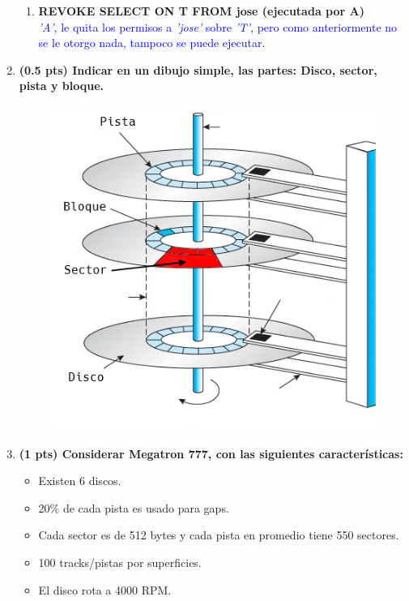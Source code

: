 \documentclass{templateNote}
\begin{document}
\begin{enumerate}
\begin{enumerate}
        \item \textbf{REVOKE SELECT ON T FROM jose (ejecutada por A)}
        \\ \textcolor{blue}{\textit{'A'}, le quita los permisos a \textit{'jose'} sobre \textit{'T'}, pero como anteriormente no se le otorgo nada, tampoco se puede ejecutar.}
    \end{enumerate}

    \newpage
    \item \textbf{(0.5 pts) Indicar en un dibujo simple, las partes: Disco, sector, pista y bloque.}
    
    \begin{figure}[H]
        \centering
        \includegraphics[width=1\textwidth]{img/DibujoDisco.png}
    \end{figure}
    \newpage
    \item \textbf{(1 pts) Considerar Megatron 777, con las siguientes características:}
    \begin{itemize}
        \item Existen 6 discos.
        \item 20\% de cada pista es usado para gaps.
        \item Cada sector es de 512 bytes y cada pista en promedio tiene 550 sectores.
        \item 100 tracks/pistas por superficies.
        \item El disco rota a 4000 RPM.
    \end{itemize}


\end{enumerate}
\end{document}
